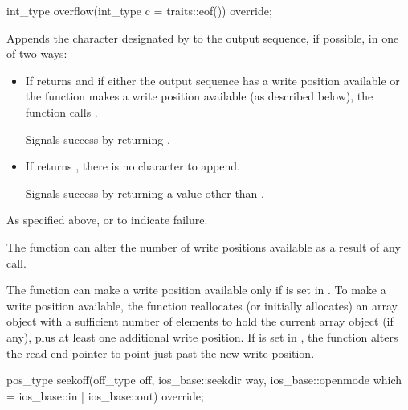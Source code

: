 %
\begin{itemdecl}
int_type overflow(int_type c = traits::eof()) override;
\end{itemdecl}

\begin{itemdescr}
\pnum
\effects
Appends the character designated by  to the output
sequence, if possible, in one of two ways:
\begin{itemize}
\item
If
returns
and if either
the output sequence has a write position available or
the function makes a write position available
(as described below),
the function calls
.

Signals success by returning .

\item
If
returns
,
there is no character to append.

Signals success by returning a value other than
.
\end{itemize}

\pnum
\returns
As specified above, or
to indicate failure.

\pnum
\remarks
The function can alter the number of write positions available as a
result of any call.

\pnum
The function can make a write position available only if
 is set in .
To make a write position available,
the function reallocates (or initially allocates) an array object
with a sufficient number of elements to hold
the current array object (if any), plus
at least
one additional write position.
If  is set in ,
the function alters the read end pointer
to point just past the new write position.
\end{itemdescr}

%
\begin{itemdecl}
pos_type seekoff(off_type off, ios_base::seekdir way,
                 ios_base::openmode which
                   = ios_base::in | ios_base::out) override;
\end{itemdecl}

